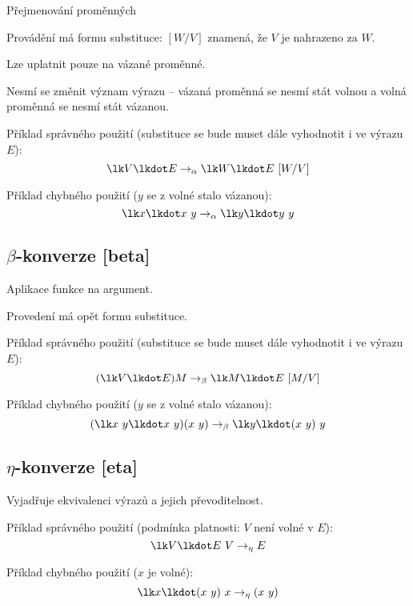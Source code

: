 \begin{compactitem}
    \item Přejmenování proměnných

    \item Provádění má formu substituce: $[W/V]$ znamená, že $V$ je nahrazeno za $W$.

    \item Lze uplatnit pouze na vázané proměnné.

    \item Nesmí se změnit význam výrazu -- vázaná proměnná se nesmí stát volnou a volná proměnná se nesmí stát vázanou.

    \item Příklad správného použití (substituce se bude muset dále vyhodnotit i ve výrazu $E$):
    $$
        \lk V \lkdot E \rightarrow_{\alpha} \lk W \lkdot E ~ [W/V]
    $$

    \item Příklad chybného použití ($y$ se z volné stalo vázanou):
    $$
        \lk x \lkdot x ~ y \rightarrow_{\alpha} \lk y \lkdot y ~ y
    $$
\end{compactitem}

\subsection{$\beta$-konverze [beta]}

\begin{compactitem}
    \item Aplikace funkce na argument.

    \item Provedení má opět formu substituce.

    \item Příklad správného použití (substituce se bude muset dále vyhodnotit i ve výrazu $E$):
    $$
        ( \lk V \lkdot E ) M \rightarrow_{\beta} \lk M \lkdot E ~ [M/V]
    $$

    \item Příklad chybného použití ($y$ se z volné stalo vázanou):
    $$
        ( \lk x ~ y \lkdot x ~ y ) ( x ~ y ) \rightarrow_{\beta} \lk y \lkdot (x ~ y) ~ y
    $$
\end{compactitem}

\subsection{$\eta$-konverze [eta]}

\begin{compactitem}
    \item Vyjadřuje ekvivalenci výrazů a jejich převoditelnost.

    \item Příklad správného použití (podmínka platnosti: $V$ není volné v $E$):
    $$ \lk V \lkdot E ~ V \rightarrow_{\eta} E $$

    \item Příklad chybného použití ($x$ je volné):
    $$ \lk x \lkdot (x ~ y) ~ x \rightarrow_{\eta} (x ~ y) $$

\end{compactitem}

